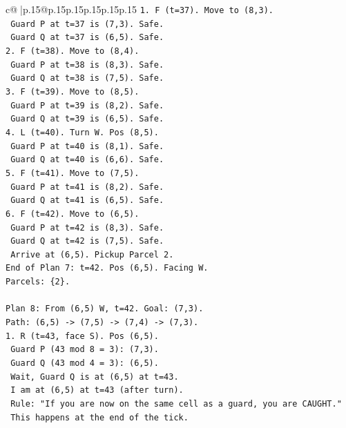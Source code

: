 \documentclass{article}
\begin{document}
{\begin{supertabular}{c@{$\;$}|p{.15\linewidth}@{}p{.15\linewidth}p{.15\linewidth}p{.15\linewidth}p{.15\linewidth}p{.15\linewidth}}
{{{\texttt{1. F (t=37). Move to (8,3).} \\
\texttt{   Guard P at t=37 is (7,3). Safe.} \\
\texttt{   Guard Q at t=37 is (6,5). Safe.} \\
\texttt{2. F (t=38). Move to (8,4).} \\
\texttt{   Guard P at t=38 is (8,3). Safe.} \\
\texttt{   Guard Q at t=38 is (7,5). Safe.} \\
\texttt{3. F (t=39). Move to (8,5).} \\
\texttt{   Guard P at t=39 is (8,2). Safe.} \\
\texttt{   Guard Q at t=39 is (6,5). Safe.} \\
\texttt{4. L (t=40). Turn W. Pos (8,5).} \\
\texttt{   Guard P at t=40 is (8,1). Safe.} \\
\texttt{   Guard Q at t=40 is (6,6). Safe.} \\
\texttt{5. F (t=41). Move to (7,5).} \\
\texttt{   Guard P at t=41 is (8,2). Safe.} \\
\texttt{   Guard Q at t=41 is (6,5). Safe.} \\
\texttt{6. F (t=42). Move to (6,5).} \\
\texttt{   Guard P at t=42 is (8,3). Safe.} \\
\texttt{   Guard Q at t=42 is (7,5). Safe.} \\
\texttt{   Arrive at (6,5). Pickup Parcel 2.} \\
\texttt{End of Plan 7: t=42. Pos (6,5). Facing W.} \\
\texttt{Parcels: \{2\}.} \\
\\ 
\texttt{Plan 8: From (6,5) W, t=42. Goal: (7,3).} \\
\texttt{Path: (6,5) {-}> (7,5) {-}> (7,4) {-}> (7,3).} \\
\texttt{1. R (t=43, face S). Pos (6,5).} \\
\texttt{   Guard P (43 mod 8 = 3): (7,3).} \\
\texttt{   Guard Q (43 mod 4 = 3): (6,5).} \\
\texttt{   Wait, Guard Q is at (6,5) at t=43.} \\
\texttt{   I am at (6,5) at t=43 (after turn).} \\
\texttt{   Rule: "If you are now on the same cell as a guard, you are CAUGHT."} \\
\texttt{   This happens at the end of the tick.} \\
}}}
\end{supertabular}}
\end{document}
